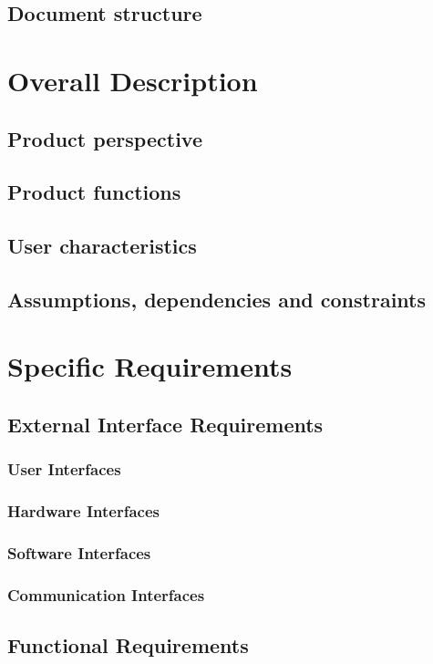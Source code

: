 \documentclass[table, 12pt]{article}
\begin{document}
\subsection{Document structure}

\section{Overall Description}
\subsection{Product perspective}
\subsection{Product functions}
\subsection{User characteristics}
\subsection{Assumptions, dependencies and constraints}

\section{Specific Requirements}
\subsection{External Interface Requirements}
\subsubsection{User Interfaces}
\subsubsection{Hardware Interfaces}
\subsubsection{Software Interfaces}
\subsubsection{Communication Interfaces}

\subsection{Functional Requirements}
\end{document}
